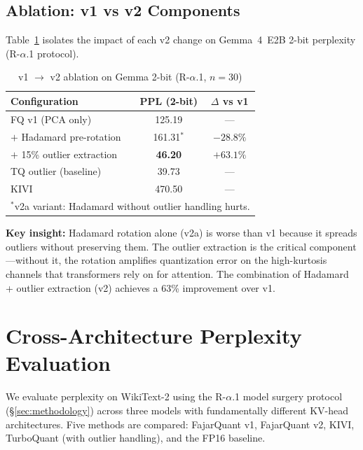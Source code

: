 \documentclass[10pt,twocolumn]{article}
\begin{document}
\subsection{Ablation: v1 vs v2 Components}

Table~\ref{tab:v1v2_ablation} isolates the impact of each v2 change
on Gemma~4~E2B 2-bit perplexity (R-$\alpha$.1 protocol).

\begin{table}[t]
\centering
\small
\caption{v1 $\to$ v2 ablation on Gemma 2-bit (R-$\alpha$.1, $n{=}30$)}
\label{tab:v1v2_ablation}
\begin{tabular}{lcc}
\toprule
Configuration & PPL (2-bit) & $\Delta$ vs v1 \\
\midrule
FQ v1 (PCA only) & 125.19 & --- \\
$+$ Hadamard pre-rotation & 161.31$^*$ & $-28.8\%$ \\
$+$ 15\% outlier extraction & \textbf{46.20} & $+63.1\%$ \\
\midrule
TQ outlier (baseline) & 39.73 & --- \\
KIVI & 470.50 & --- \\
\bottomrule
\multicolumn{3}{l}{\footnotesize $^*$v2a variant: Hadamard without outlier handling hurts.} \\
\end{tabular}
\end{table}

\textbf{Key insight:} Hadamard rotation alone (v2a) is worse than v1
because it spreads outliers without preserving them. The outlier
extraction is the critical component---without it, the rotation
amplifies quantization error on the high-kurtosis channels that
transformers rely on for attention. The combination of Hadamard +
outlier extraction (v2) achieves a 63\% improvement over v1.

\section{Cross-Architecture Perplexity Evaluation}
\label{sec:perplexity}

We evaluate perplexity on WikiText-2 using the R-$\alpha$.1 model
surgery protocol (\S\ref{sec:methodology}) across three models with
fundamentally different KV-head architectures. Five methods are
compared: FajarQuant v1, FajarQuant v2, KIVI, TurboQuant (with
outlier handling), and the FP16 baseline.
\end{document}
